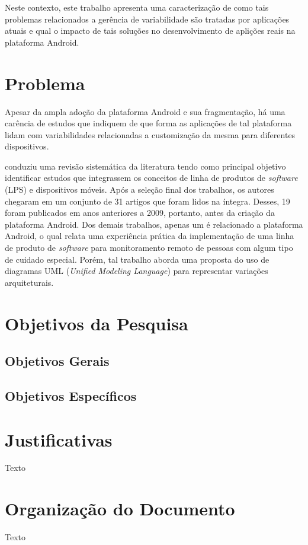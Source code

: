 Neste contexto, este trabalho apresenta uma caracterização de como tais problemas
relacionados a gerência de variabilidade são tratadas por aplicações atuais e
qual o impacto de tais soluções no desenvolvimento de aplições reais na plataforma
Android.

\section{Problema}

Apesar da ampla adoção da plataforma Android e sua fragmentação, há uma carência
de estudos que indiquem de que forma as aplicações de tal plataforma lidam com
variabilidades relacionadas a customização da mesma para diferentes dispositivos. 

\cite{FalvoJunior2015} conduziu uma revisão sistemática da literatura tendo como
principal objetivo identificar estudos que integrassem os conceitos de linha de
produtos de \textit{software} (LPS) e dispositivos móveis. Após a seleção final
dos trabalhos, os autores chegaram em um conjunto de 31 artigos que foram lidos
na íntegra. Desses, 19 foram publicados em anos anteriores a 2009, portanto, antes
da criação da plataforma Android. Dos demais trabalhos, apenas um é relacionado a
plataforma Android, o qual relata uma experiência prática da implementação de uma
linha de produto de \textit{software} para monitoramento remoto de pessoas com
algum tipo de cuidado especial. Porém, tal trabalho aborda uma proposta do uso de
diagramas UML (\textit{Unified Modeling Language}) para representar variações arquiteturais.

\section{Objetivos da Pesquisa}

\subsection{Objetivos Gerais}

\subsection{Objetivos Específicos}

\section{Justificativas}

Texto

\section{Organização do Documento}

Texto
